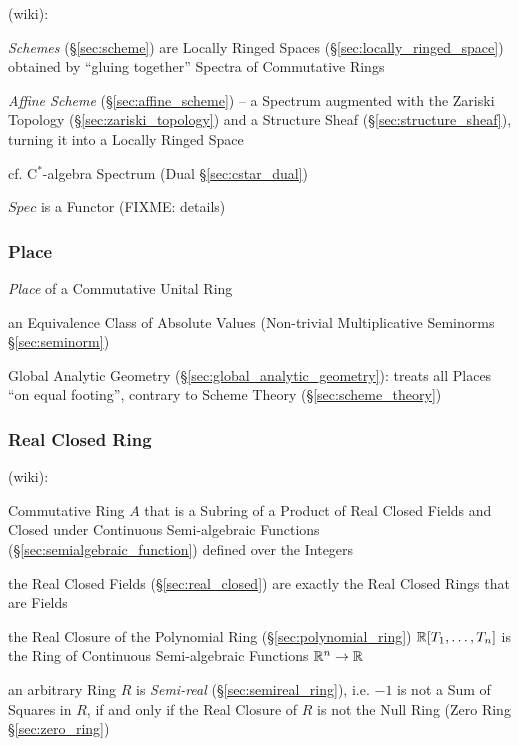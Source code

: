 (wiki):

\fist \emph{Schemes} (\S\ref{sec:scheme}) are Locally Ringed Spaces
(\S\ref{sec:locally_ringed_space}) obtained by ``gluing together'' Spectra of
Commutative Rings

\fist \emph{Affine Scheme} (\S\ref{sec:affine_scheme}) -- a Spectrum augmented
with the Zariski Topology (\S\ref{sec:zariski_topology}) and a Structure Sheaf
(\S\ref{sec:structure_sheaf}), turning it into a Locally Ringed Space

\fist cf. C$^*$-algebra Spectrum (Dual \S\ref{sec:cstar_dual})

$Spec$ is a Functor (FIXME: details)



\subsubsection{Place}\label{sec:place}

\emph{Place} of a Commutative Unital Ring

an Equivalence Class of Absolute Values (Non-trivial Multiplicative Seminorms
\S\ref{sec:seminorm})

\fist Global Analytic Geometry (\S\ref{sec:global_analytic_geometry}): treats
all Places ``on equal footing'', contrary to Scheme Theory
(\S\ref{sec:scheme_theory})



\subsubsection{Real Closed Ring}\label{sec:real_closed_ring}

(wiki):

Commutative Ring $A$ that is a Subring of a Product of Real Closed Fields and
Closed under Continuous Semi-algebraic Functions
(\S\ref{sec:semialgebraic_function}) defined over the Integers

the Real Closed Fields (\S\ref{sec:real_closed}) are exactly the Real Closed
Rings that are Fields

the Real Closure of the Polynomial Ring (\S\ref{sec:polynomial_ring})
$\mathbb{R}[T_1,\ldots,T_n]$ is the Ring of Continuous Semi-algebraic Functions
$\mathbb{R}^n \rightarrow \mathbb{R}$

an arbitrary Ring $R$ is \emph{Semi-real} (\S\ref{sec:semireal_ring}), i.e.
$-1$ is not a Sum of Squares in $R$, if and only if the Real Closure of $R$ is
not the Null Ring (Zero Ring \S\ref{sec:zero_ring})

